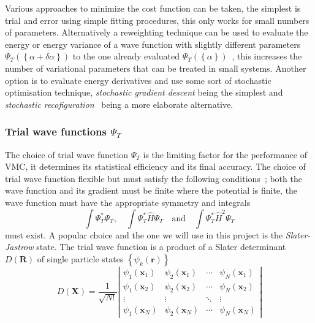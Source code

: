 \documentclass[final,3p,times,twocolumn]{elsarticle}
\begin{document}
	Various approaches to minimize the cost function can be taken, the simplest is trial and error using simple fitting procedures, this only works for small numbers of parameters. Alternatively a reweighting technique can be used to evaluate the energy or energy variance of a wave function with slightly different parameters $\Psi_{T}(\left\{\alpha + \delta \alpha\right\})$ to the one already evaluated $\Psi_{T}(\left\{\alpha\right\})$~\cite{umrigar1988optimized}, this increases the number of variational parameters that can be treated in small systems. Another option is to evaluate energy derivatives and use some sort of stochastic optimisation technique, \emph{stochastic gradient descent} being the simplest and \emph{stochastic recofiguration}~\cite{sorella1998green} being a more elaborate alternative. 
		
	\subsubsection{Trial wave functions $\Psi_{T}$}
	The choice of trial wave function $\Psi_{T}$ is the limiting factor for the performance of VMC, it determines its statistical efficiency and its final accuracy. The choice of trial wave function flexible but must satisfy the following conditions~\cite{foulkes2001quantum}; both the wave function and its gradient must be finite where the potential is finite, the wave function must have the appropriate symmetry and integrals 
	\begin{equation}
		\int \Psi_{T}^{*} \Psi_{T}, \quad \int \Psi_{T}^{*} \hat{H} \Psi_{T} \quad \text{and} \quad \int \Psi_{T}^{*} \hat{H}^{2} \Psi_{T}
	\end{equation}
	must exist. A popular choice and the one we will use in this project is the \emph{Slater-Jastrow} state. The trial wave function is a product of a Slater determinant $D(\mathbf{R})$ of single particle states $\left\{\psi_k(\mathbf{r})\right\}$ 
	\begin{equation}
		D(\mathbf{X}) = \frac{1}{\sqrt{N !}}\left|\begin{array}{cccc}\psi_{1}\left(\mathbf{x}_{1}\right) & \psi_{2}\left(\mathbf{x}_{1}\right) & \cdots & \psi_{N}\left(\mathbf{x}_{1}\right) \\ \psi_{1}\left(\mathbf{x}_{2}\right) & \psi_{2}\left(\mathbf{x}_{2}\right) & \cdots & \psi_{N}\left(\mathbf{x}_{2}\right) \\ \vdots & \vdots & \ddots & \vdots \\ \psi_{1}\left(\mathbf{x}_{N}\right) & \psi_{2}\left(\mathbf{x}_{N}\right) & \cdots & \psi_{N}\left(\mathbf{x}_{N}\right)\end{array}\right|
	\end{equation}	
\end{document}
